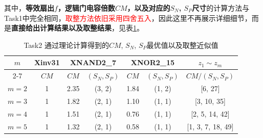 \documentclass[UTF8,12pt,a4paper]{ctexart}
\begin{document}
其中，\textbf{等效扇出$f$，逻辑门电容倍数$CM$，以及对应的$S_N$, $S_P$尺寸}的计算方法与Task1中完全相同，\textcolor{red}{取整方法依旧采用四舍五入}，因此这里不再展示详细细节，而是\textbf{直接给出计算结果以及取整结果}，见表\ref{tab:task2_theo_best_sf}。
\begin{table}[htbp]
    \centering
    \caption{Task2 通过理论计算得到的$CM$, $S_N$, $S_P$最优值以及取整近似值}
    \label{tab:task2_theo_best_sf}
    \small
    \begin{tabular}{ccccccc}
    \toprule
    \multirow{2}{*}{$m$} & Xinv31 & \multicolumn{2}{c}{XNAND2\_7} & \multicolumn{2}{c}{XNOR2\_15} & $z_1 \sim z_m$ \\
    \cmidrule(lr){2-7} 
     & $CM$ & $CM$ & $(S_N, S_P)$ & $CM$ & $(S_N, S_P)$ & $CM/(S_N, S_P)$ \\
    \midrule
    $m=2$ & 1 & 2.35 & (3, 2) & 1.84 & (1, 2) & [6, 27] \\
    \midrule
    $m=3$ & 1 & 1.82 & (2, 1) & 1.10 & (1, 1)  & [3, 10, 35] \\
    \midrule
    $m=4$ & 1 & 1.51 & (2, 1) & 0.76 & (1, 1) & [2, 5, 14, 42] \\
    \midrule
    $m=5$ & 1 & 1.32 & (2, 1) & 0.58 & (1, 1) & [1, 3, 7, 18, 49] \\
    \bottomrule
    \end{tabular}
\end{table}
\end{document}
